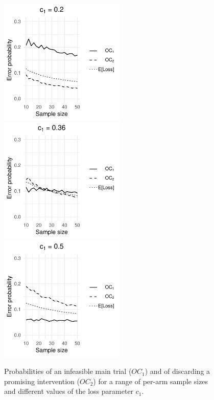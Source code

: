 \documentclass[AMA,STIX1COL]{WileyNJD-v2}
\begin{document}
\begin{figure}
\centering
\includegraphics[height=6cm, trim={0 0 2.5cm 0},clip]{./figures/tiga_c02}\hspace{0.5cm}
\includegraphics[height=6cm, trim={1.1cm 0 2.5cm 0},clip]{./figures/tiga_c036}\hspace{0.5cm}
\includegraphics[height=6cm, trim={1.1cm 0 0 0},clip]{./figures/tiga_c05}
\caption{Probabilities of an infeasible main trial ($OC_1$) and of discarding a promising intervention ($OC_2$) for a range of per-arm sample sizes and different values of the loss parameter $c_1$.}
\label{fig:tiga_ocs}
\end{figure}
\end{document}
